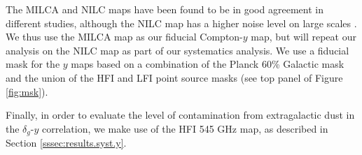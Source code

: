 \documentclass[useAMS,usenatbib]{mn2e}
\begin{document}
    The MILCA and NILC maps have been found to be in good agreement in different studies, although the NILC map has a higher noise level on large scales \citep{2016A&A...594A..22P}. We thus use the MILCA map as our fiducial Compton-$y$ map, but will repeat our analysis on the NILC map as part of our systematics analysis. We use a fiducial mask for the $y$ maps based on a combination of the Planck 60\% Galactic mask and the union of the HFI and LFI point source masks (see top panel of Figure \ref{fig:msk}).
    
    Finally, in order to evaluate the level of contamination from extragalactic dust in the $\delta_g$-$y$ correlation, we make use of the HFI 545 GHz map, as described in Section \ref{sssec:results.syst.y}.
    
\end{document}

